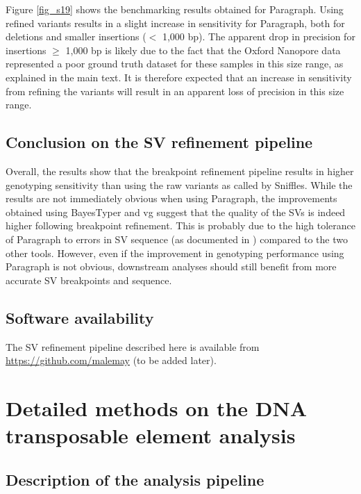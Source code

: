 \documentclass[12pt]{article}
\begin{document}
Figure \ref{fig_s19} shows the benchmarking results obtained for Paragraph.
Using refined variants results in a slight increase in sensitivity for Paragraph, both for deletions and smaller insertions ($<$ 1,000 bp).
The apparent drop in precision for insertions $\geq$ 1,000 bp is likely due to the fact that the Oxford Nanopore data represented a poor ground truth dataset for these samples in this size range, as explained in the main text.
It is therefore expected that an increase in sensitivity from refining the variants will result in an apparent loss of precision in this size range.

\subsection{Conclusion on the SV refinement pipeline}

Overall, the results show that the breakpoint refinement pipeline results in higher genotyping sensitivity than using the raw variants as called by Sniffles.
While the results are not immediately obvious when using Paragraph, the improvements obtained using BayesTyper and vg suggest that the quality of the SVs is indeed higher following breakpoint refinement.
This is probably due to the high tolerance of Paragraph to errors in SV sequence (as documented in \cite{paragraph}) compared to the two other tools.
However, even if the improvement in genotyping performance using Paragraph is not obvious, downstream analyses should still benefit from more accurate SV breakpoints and sequence.

\subsection{Software availability}

The SV refinement pipeline described here is available from \textcolor{red}{\url{https://github.com/malemay}} (to be added later).

\clearpage

\section{Detailed methods on the DNA transposable element analysis}

\subsection{Description of the analysis pipeline}
\end{document}
